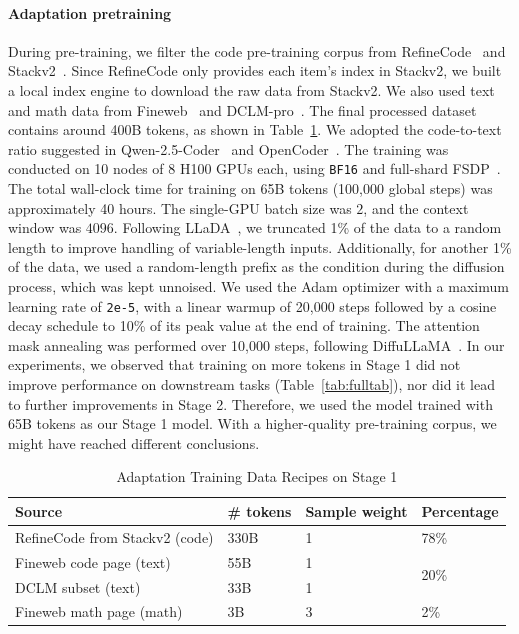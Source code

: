 \paragraph{Adaptation pretraining}
During pre-training, we filter the code pre-training corpus from RefineCode~\citep{huang2024opencoder} and Stackv2~\citep{lozhkov2024starcoder}. Since RefineCode only provides each item's index in Stackv2, we built a local index engine to download the raw data from Stackv2. 
We also used text and math data from Fineweb~\citep{penedo2024finewebdatasetsdecantingweb} and DCLM-pro~\citep{zhou2024programming}. 
The final processed dataset contains around 400B tokens, as shown in Table~\ref{tab:training-data-recipes}. We adopted the code-to-text ratio suggested in Qwen-2.5-Coder~\citep{hui2024qwen2} and OpenCoder~\citep{huang2024opencoder}. 
The training was conducted on 10 nodes of 8 H100 GPUs each, using \texttt{BF16} and full-shard FSDP~\citep{zhao2023Fsdp}. The total wall-clock time for training on 65B tokens (100,000 global steps) was approximately 40 hours. 
The single-GPU batch size was $2$, and the context window was $4096$. Following LLaDA~\citep{nie2024scaling}, we truncated 1\% of the data to a random length to improve handling of variable-length inputs. 
Additionally, for another 1\% of the data, we used a random-length prefix as the condition during the diffusion process, which was kept unnoised. 
We used the Adam optimizer with a maximum learning rate of \texttt{2e-5}, with a linear warmup of 20,000 steps followed by a cosine decay schedule to 10\% of its peak value at the end of training. The attention mask annealing was performed over 10,000 steps, following DiffuLLaMA~\citep{gong2025scaling}. 
In our experiments, we observed that training on more tokens in Stage 1 did not improve performance on downstream tasks (Table~\ref{tab:fulltab}), nor did it lead to further improvements in Stage 2. 
Therefore, we used the model trained with 65B tokens as our Stage 1 model. With a higher-quality pre-training corpus, we might have reached different conclusions. 

\begin{table}[ht]
\centering
\begin{tabular}{@{} l l l l @{}} 
\toprule
\textbf{Source}                  & \textbf{\# tokens} & \textbf{Sample weight} & \textbf{Percentage} \\ 
\midrule
RefineCode from Stackv2 (code)        & 330B               & 1                      & 78\%               \\ 
Fineweb code page (text)     & 55B                & 1                      & \multirow{2}{*}{20\%} \\ 
DCLM subset  (text)      & 33B                & 1                      &                    \\ 
Fineweb math page (math)              & 3B                 & 3                      & 2\%                \\ 
\bottomrule
\end{tabular}
\caption{Adaptation Training Data Recipes on Stage 1}
\label{tab:training-data-recipes}
\end{table}


